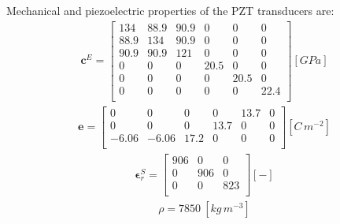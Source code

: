 \documentclass[sensors,article,submit,moreauthors,pdftex]{Definitions/mdpi}
\begin{document}
Mechanical and piezoelectric properties of the PZT transducers are:
\begin{eqnarray}
\textbf{c}^E=\left [ 
\begin{array}{cccccc}
134 & 88.9 & 90.9 & 0 & 0 & 0 \\ 
88.9 & 134 & 90.9 & 0 & 0 & 0 \\
90.9 & 90.9 & 121 & 0 & 0 & 0 \\
0 & 0 & 0 & 20.5 & 0 & 0 \\
0 & 0 & 0 & 0 & 20.5 & 0 \\
0 & 0 & 0 & 0 & 0 & 22.4 \nonumber \\
\end{array}
\right ] \left [ GPa \right ]
\end{eqnarray}
\begin{eqnarray}
\textbf{e}=\left[
\begin{array}{cccccc}
0 & 0 & 0 & 0 & 13.7 & 0\\
0 & 0 & 0 & 13.7 & 0 & 0\\
-6.06 & -6.06 & 17.2 & 0 & 0 & 0\nonumber \\
\end{array}
\right] \left[C\,m^{-2}\right]
\end{eqnarray}
\begin{eqnarray}
\boldsymbol{\epsilon}^S_r=\left[
\begin{array}{ccc}
906 & 0 & 0\\
0 & 906 & 0\\
0 & 0 & 823\nonumber \\
\end{array}
\right] \left[ - \right]
\end{eqnarray}
\begin{eqnarray}
\rho=7850\ [kg\,m^{-3}] \nonumber
\end{eqnarray}


{}

\end{document}
